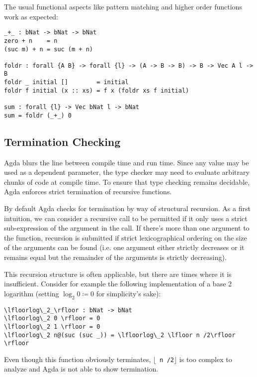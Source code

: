 The usual functional aspects like pattern matching and higher order functions work as expected:

\begin{lstlisting}[caption={Functions},label={lst:tutorial:functional},emph={foldr,sum}]
_+_ : bNat -> bNat -> bNat
zero + n    = n
(suc m) + n = suc (m + n)

foldr : forall {A B} -> forall {l} -> (A -> B -> B) -> B -> Vec A l -> B
foldr _ initial []        = initial
foldr f initial (x :: xs) = f x (foldr xs f initial)

sum : forall {l} -> Vec bNat l -> bNat
sum = foldr (_+_) 0
\end{lstlisting}

\subsection{Termination Checking}
Agda blurs the line between compile time and run time. Since any value may be used as a dependent parameter, the type checker may need to evaluate arbitrary chunks of code at compile time. To ensure that type checking remains decidable, Agda enforces strict termination of recursive functions.

By default Agda checks for termination by way of structural recursion. As a first intuition, we can consider a recursive call to be permitted if it only uses a strict sub-expression of the argument in the call. If there's more than one argument to the function, recursion is submitted if strict lexicographical ordering on the size of the arguments can be found (i.e. one argument either strictly decreases or it remains equal but the remainder of the arguments is strictly decreasing).

This recursion structure is often applicable, but there are times where it is insufficient. Consider for example the following implementation of a base 2 logarithm (setting $\log_2 0 \coloneqq 0$ for simplicity's sake):

\begin{lstlisting}[caption={Base 2 Logarithm},label={lst:tutorial:log},emph={log}]
\lfloorlog\_2_\rfloor : bNat -> bNat
\lfloorlog\_2 0 \rfloor = 0
\lfloorlog\_2 1 \rfloor = 0
\lfloorlog\_2 n@(suc (suc _)) = \lfloorlog\_2 \lfloor n /2\rfloor \rfloor
\end{lstlisting}

Even though this function obviously terminates, \texttt{$\lfloor$ n /2$\rfloor$} is too complex to analyze and Agda is not able to show termination.

